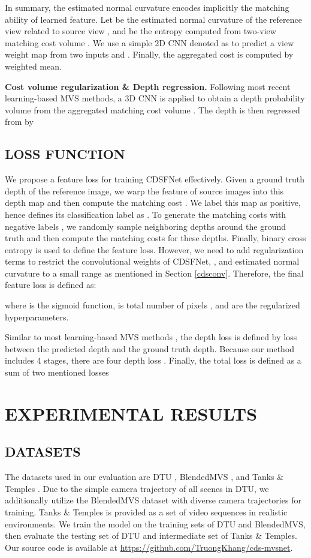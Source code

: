 \documentclass{article} \usepackage{iclr2022_conference,times}
\begin{document}
In summary, the estimated normal curvature encodes implicitly the matching ability of learned feature. Let  be the estimated normal curvature of the reference view related to source view , and  be the entropy computed from two-view matching cost volume .  We use a simple 2D CNN denoted as  to predict a view weight map  from two inputs  and . Finally, the aggregated cost  is computed by weighted mean.


\textbf{Cost volume regularization \& Depth regression.} Following most recent learning-based MVS methods, a 3D CNN is applied to obtain a depth probability volume  from the aggregated matching cost volume . The depth is then regressed from   by 



\subsection{LOSS FUNCTION}
\label{loss_function}
We propose a feature loss for training CDSFNet effectively. Given a ground truth depth  of the reference image, we warp the feature of source images into this depth map and then compute the matching cost . We label this map as positive, hence defines its classification label as . To generate the matching costs with negative labels , we randomly sample  neighboring depths  around the ground truth  and then compute the matching costs  for these depths.  Finally, binary cross entropy is used to define the feature loss. However, we need to add regularization terms to restrict the convolutional weights of CDSFNet, , and estimated normal curvature  to a small range as mentioned in Section \ref{cdsconv}. Therefore, the final feature loss is defined as:

where  is the sigmoid function,  is total number of pixels ,  and  are the regularized hyperparameters.

Similar to most learning-based MVS methods \citep{yao2018mvsnet,gu2020cascade}, the depth loss  is defined by  loss between the predicted depth and the ground truth depth. Because our method includes 4 stages, there are four depth loss . Finally, the total loss  is defined as a sum of two mentioned losses 

\section{EXPERIMENTAL RESULTS}
\subsection{DATASETS}
The datasets used in our evaluation are DTU \citep{aanaes2016large}, BlendedMVS \citep{yao2020blendedmvs}, and Tanks \& Temples \citep{knapitsch2017tanks}. Due to the simple camera trajectory of all scenes in DTU, we additionally utilize the BlendedMVS dataset with diverse camera trajectories for training. Tanks \& Temples is provided as a set of video sequences in realistic environments. We train the model on the training sets of DTU and BlendedMVS, then evaluate the testing set of DTU and intermediate set of Tanks \& Temples. Our source code is available at \url{https://github.com/TruongKhang/cds-mvsnet}. 
\end{document}
